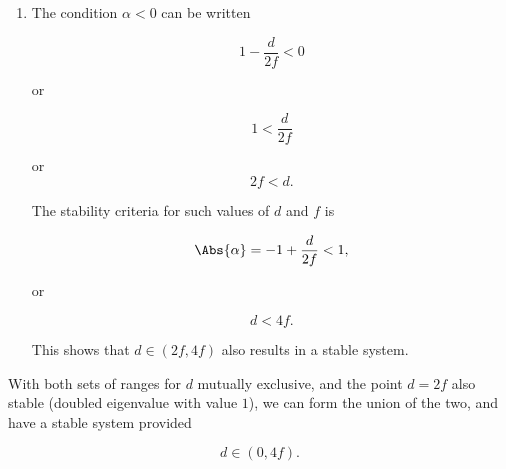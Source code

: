 {\begin{enumerate}
or
\begin{dmath}\label{eqn:problemSet4Problem2:580}
d < 2 f.
\end{dmath}

For these positive values of $\alpha$ we have

\begin{dmath}\label{eqn:problemSet4Problem2:440}
1 - \frac{d}{2f} < 1
\end{dmath}

or
\begin{dmath}\label{eqn:problemSet4Problem2:600}
\frac{d}{2f} > 0,
\end{dmath}

which just means that $d$ is positive.  This shows that $d \in (0, 2f)$ results in a stable system.

\item The condition $\alpha < 0$ can be written

\begin{dmath}\label{eqn:problemSet4Problem2:460}
1 - \frac{d}{2f} < 0
\end{dmath}

or

\begin{dmath}\label{eqn:problemSet4Problem2:480}
1 < \frac{d}{2f}
\end{dmath}

or
\begin{dmath}\label{eqn:problemSet4Problem2:500}
2f < d.
\end{dmath}

The stability criteria for such values of $d$ and $f$ is 

\begin{dmath}\label{eqn:problemSet4Problem2:520}
\Abs{\alpha} = -1 + \frac{d}{2f} < 1,
\end{dmath}

or

\begin{dmath}\label{eqn:problemSet4Problem2:540}
d < 4 f.
\end{dmath}

This shows that $d \in (2 f, 4 f)$ also results in a stable system.
\end{enumerate}

With both sets of ranges for $d$ mutually exclusive, and the point $d = 2f$ also stable (doubled eigenvalue with value $1$), we can form the union of the two, and have a stable system provided

\begin{dmath}\label{eqn:problemSet4Problem2:1120}
d \in (0, 4 f).
\end{dmath}

}
